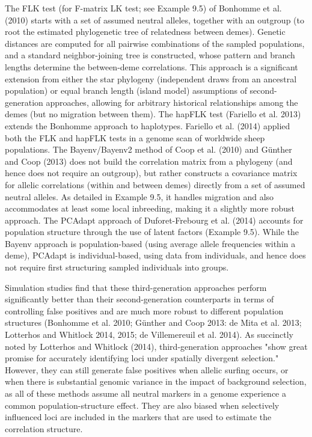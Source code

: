 \documentclass{article}
\begin{document}
The FLK test (for F-matrix LK test; see Example 9.5) of Bonhomme et al. (2010) starts with a set of assumed neutral alleles, together with an outgroup (to root the estimated phylogenetic tree of relatedness between demes). Genetic distances are computed for all pairwise combinations of the sampled populations, and a standard neighbor-joining tree is constructed, whose pattern and branch lengths determine the between-deme correlations. This approach is a significant extension from either the star phylogeny (independent draws from an ancestral population) or equal branch length (island model) assumptions of second-generation approaches, allowing for arbitrary historical relationships among the demes (but no migration between them). The hapFLK test (Fariello et al. 2013) extends the Bonhomme approach to haplotypes. Fariello et al. (2014) applied both the FLK and hapFLK tests in a genome scan of worldwide sheep populations. The Bayenv/Bayenv2 method of Coop et al. (2010) and Günther and Coop (2013) does not build the correlation matrix from a phylogeny (and hence does not require an outgroup), but rather constructs a covariance matrix for allelic correlations (within and between demes) directly from a set of assumed neutral alleles. As detailed in Example 9.5, it handles migration and also accommodates at least some local inbreeding, making it a slightly more robust approach. The PCAdapt approach of Duforet-Frebourg et al. (2014) accounts for population structure through the use of latent factors (Example 9.5). While the Bayenv approach is population-based (using average allele frequencies within a deme), PCAdapt is individual-based, using data from individuals, and hence does not require first structuring sampled individuals into groups.

Simulation studies find that these third-generation approaches perform significantly better than their second-generation counterparts in terms of controlling false positives and are much more robust to different population structures (Bonhomme et al. 2010; Günther and Coop 2013: de Mita et al. 2013; Lotterhos and Whitlock 2014, 2015; de Villemereuil et al. 2014). As succinctly noted by Lotterhos and Whitlock (2014), third-generation approaches "show great promise for accurately identifying loci under spatially divergent selection." However, they can still generate false positives when allelic surfing occurs, or when there is substantial genomic variance in the impact of background selection, as all of these methods assume all neutral markers in a genome experience a common population-structure effect. They are also biased when selectively influenced loci are included in the markers that are used to estimate the correlation structure.
\end{document}
